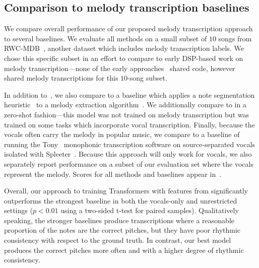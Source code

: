 \vspace{-1mm}
\subsection{Comparison to melody transcription baselines}
\label{sec:exp2}

We compare overall performance of our proposed melody transcription approach to several baselines. 
We evaluate all methods on a small subset of $10$ songs from RWC-MDB~\cite{goto2002rwc,goto2003rwc,goto2004development}, 
another dataset which includes melody transcription labels. 
We chose this specific subset in an effort to compare to early DSP-based work on melody transcription---none of the early approaches~\cite{paiva2004auditory,paiva2005detection,ryynanen2008automatic,weil2009automatic} shared code, however~\cite{ryynanen2008automatic} shared melody transcriptions for this $10$-song subset.

In addition to~\cite{ryynanen2008automatic}, we also compare to a baseline which applies a note segmentation heuristic~\cite{salamon2015midi} to a melody extraction algorithm~\cite{salamon2012melody}. 
We additionally compare to \mtthree{} in a zero-shot fashion---this model was not trained on melody transcription but was trained on some tasks which incorporate vocal transcription. 
Finally, because the vocals often carry the melody in popular music, we compare to a baseline of running the Tony~\cite{mauch2015computer} monophonic transcription software on source-separated vocals isolated with Spleeter~\cite{hennequin2020spleeter}. 
Because this approach will only work for vocals, we also separately report performance on a subset of our evaluation set where the vocals represent the melody. 
Scores for all methods and baselines appear in~. 

Overall, our approach to training Transformers with features from \jukebox{} significantly outperforms the strongest baseline in both the vocals-only and unrestricted settings (${p < 0.01}$ using a two-sided t-test for paired samples). 
Qualitatively speaking, the stronger baselines produce transcriptions where a reasonable proportion of the notes are the correct pitches, but they have poor rhythmic consistency with respect to the ground truth. 
In contrast, our best model produces the correct pitches more often and with a higher degree of rhythmic consistency.